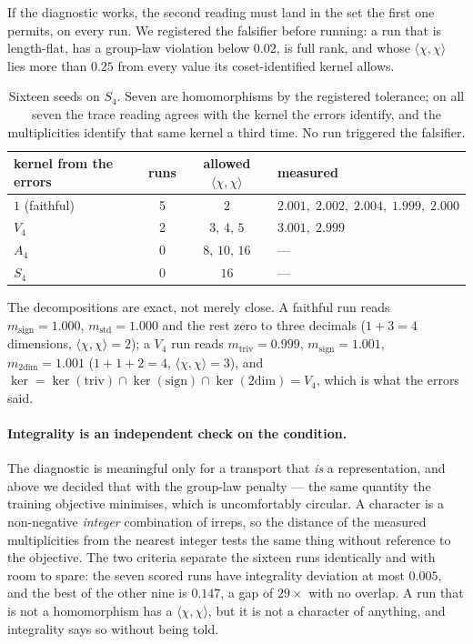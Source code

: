 \documentclass[10pt]{article}
\begin{document}
If the diagnostic works, the second reading must land in the set the first one permits, on every
run. We registered the falsifier before running: a run that is length-flat, has a group-law
violation below $0.02$, is full rank, and whose $\langle\chi,\chi\rangle$ lies more than $0.25$ from
every value its coset-identified kernel allows.

\begin{table}[H]\centering\small
\caption{Sixteen seeds on $S_4$. Seven are homomorphisms by the registered tolerance; on all seven
the trace reading agrees with the kernel the errors identify, and the multiplicities identify that
same kernel a third time. No run triggered the falsifier.}
\begin{tabular}{lccl}
\toprule
kernel from the errors & runs & allowed $\langle\chi,\chi\rangle$ & measured \\
\midrule
$1$ (faithful) & 5 & $2$          & $2.001,\;2.002,\;2.004,\;1.999,\;2.000$ \\
$V_4$          & 2 & $3,\,4,\,5$  & $3.001,\;2.999$ \\
$A_4$          & 0 & $8,\,10,\,16$& --- \\
$S_4$          & 0 & $16$         & --- \\
\bottomrule
\end{tabular}
\label{tab:char}
\end{table}

The decompositions are exact, not merely close. A faithful run reads $m_{\text{sign}}=1.000$,
$m_{\text{std}}=1.000$ and the rest zero to three decimals ($1+3=4$ dimensions,
$\langle\chi,\chi\rangle=2$); a $V_4$ run reads $m_{\text{triv}}=0.999$, $m_{\text{sign}}=1.001$,
$m_{2\text{dim}}=1.001$ ($1+1+2=4$, $\langle\chi,\chi\rangle=3$), and
$\ker=\ker(\text{triv})\cap\ker(\text{sign})\cap\ker(2\text{dim})=V_4$, which is what the errors said.

\paragraph{Integrality is an independent check on the condition.} The diagnostic is meaningful only
for a transport that \emph{is} a representation, and above we decided that with the group-law
penalty --- the same quantity the training objective minimises, which is uncomfortably circular. A
character is a non-negative \emph{integer} combination of irreps, so the distance of the measured
multiplicities from the nearest integer tests the same thing without reference to the objective. The
two criteria separate the sixteen runs identically and with room to spare: the seven scored runs have
integrality deviation at most $0.005$, and the best of the other nine is $0.147$, a gap of $29\times$
with no overlap. A run that is not a homomorphism has a $\langle\chi,\chi\rangle$, but it is not a
character of anything, and integrality says so without being told.
\end{document}
